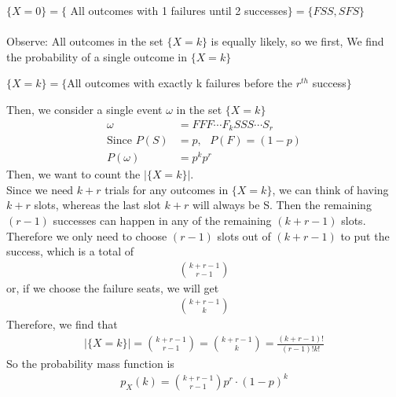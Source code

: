 \documentclass[11pt,oneside]{book}
\theoremstyle{break}
\theoremstyle{break}
\begin{document}
$\{X=0\}=\{$ All outcomes with 1 failures until 2 successes$\}=\{FSS,SFS\}$\\
\hfill\\
Observe: All outcomes in the set $\{X=k\}$ is equally likely, so we first, We find the probability of a single outcome in $\{X=k\}$\begin{center}
$\{X=k\}=\{$All outcomes with exactly k failures before the $r^{th}$ success$\}$
\end{center}
Then, we consider a single event $\omega$ in the set $\{X=k\}$\begin{align*}
\omega &= FFF\cdots F_kSSS\cdots S_r\\ 
\text{Since }P(S)&=p,\text{ }P(F)=(1-p)\\
P(\omega)&=p^{k}p^{r}
\end{align*}
Then, we want to count the $|\{X=k\}|$. \\
Since we need $k+r$ trials for any outcomes in $\{X=k\}$, we can think of having $k+r$ slots,  whereas the last slot $k+r$ will always be S. Then the remaining $(r-1)$ successes can happen in any of the remaining $(k+r-1)$ slots. \\
Therefore we only need to choose $(r-1)$ slots out of $(k+r-1)$ to put the success, which is a total of\begin{align*}
\binom{k+r-1}{r-1}
\end{align*}
or, if we choose the failure seats, we will get \begin{align*}
\binom{k+r-1}{k}
\end{align*}
Therefore, we find that \begin{align*}
|\{X=k\}|=\binom{k+r-1}{r-1}=\binom{k+r-1}{k}=\frac{(k+r-1)!}{(r-1)!k!}
\end{align*}
So the probability mass function is \begin{align*}
p_X(k)=\binom{k+r-1}{r-1}p^r\cdot (1-p)^k
\end{align*}
\end{document}
